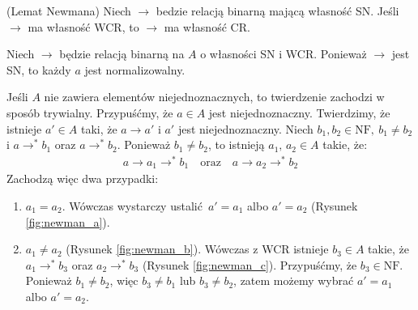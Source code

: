 \begin{twierdzenie}(Lemat Newmana)\label{thm:newman_lemma}
Niech \(\to\) bedzie relacją binarną mającą własność SN. Jeśli \(\to\) ma własność WCR, to \(\to\) ma własność CR.
\end{twierdzenie}
\begin{dowod}

Niech \(\to\) będzie relacją binarną na \(A\) o własności SN i WCR. Ponieważ \(\to\) jest SN, to każdy \(a\) jest normalizowalny.

  Jeśli \(A\) nie zawiera elementów niejednoznacznych, to twierdzenie zachodzi w sposób trywialny. Przypuśćmy, że \(a\in A\) jest niejednoznaczny. Twierdzimy, że istnieje \(a'\in A\) taki, że \(a\to a'\) i \(a'\) jest niejednoznaczny. Niech \(b_1, b_2\in \mathrm{NF},\ b_1\neq b_2\) i \(a\to^{*} b_1\) oraz \(a\to^{*} b_2\). Ponieważ \(b_1\neq b_2\), to istnieją \(a_1,\,a_2\in A\) takie, że: 
      \begin{align*}
        a \to a_1 \to^{*} b_1 \quad \text{oraz} \quad a\to a_2 \to^{*} b_2
      \end{align*}
Zachodzą więc dwa przypadki:
  \begin{enumerate}[label={\roman*)}, ref={\roman*)}]
    \setlength\itemsep{0em}
    \item \(a_1 = a_2\). Wówczas wystarczy ustalić \(a'=a_1\) albo \(a'=a_2\) (Rysunek \ref{fig:newman_a}).
    \item \(a_1\neq a_2\) (Rysunek \ref{fig:newman_b}). Wówczas z WCR istnieje \(b_3\in A\) takie, że \(a_1 \to^{*} b_3\) oraz \(a_2\to^{*} b_3\) (Rysunek \ref{fig:newman_c}). Przypuśćmy, że \(b_3\in\mathrm{NF}\). Ponieważ \(b_1\neq b_2\), więc \(b_3\neq b_1\) lub \(b_3\neq b_2\), zatem możemy wybrać \(a'=a_1\) albo \(a'=a_2\).  
    \begin{center}
      \begin{minipage}{0.75\linewidth}
        \begin{figure}[H]
          \centering
          \hspace{4em}

\end{figure}
\end{minipage}
\end{center}
\end{enumerate}
\end{dowod}
